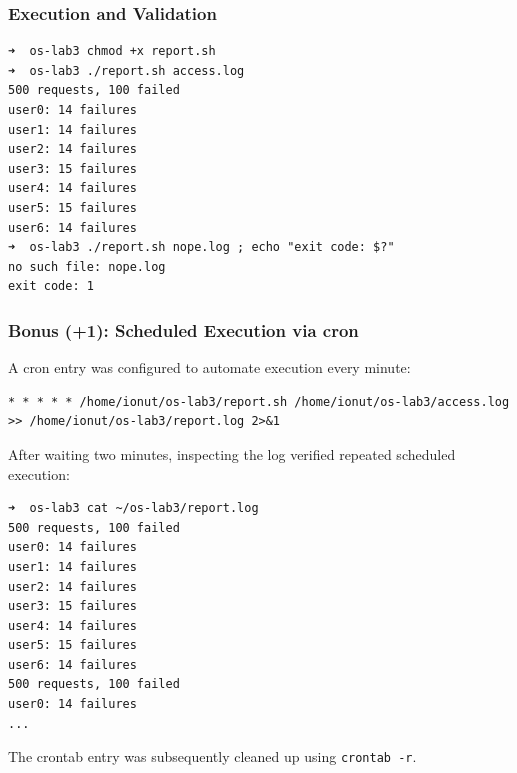 \documentclass{labreport}
\begin{document}
\subsubsection{Execution and Validation}
\begin{lstlisting}[style=bash]
➜  os-lab3 chmod +x report.sh
➜  os-lab3 ./report.sh access.log
500 requests, 100 failed
user0: 14 failures
user1: 14 failures
user2: 14 failures
user3: 15 failures
user4: 14 failures
user5: 15 failures
user6: 14 failures
➜  os-lab3 ./report.sh nope.log ; echo "exit code: $?"
no such file: nope.log
exit code: 1
\end{lstlisting}

\subsubsection*{Bonus (+1): Scheduled Execution via cron}
A cron entry was configured to automate execution every minute:
\begin{lstlisting}[style=bash]
* * * * * /home/ionut/os-lab3/report.sh /home/ionut/os-lab3/access.log >> /home/ionut/os-lab3/report.log 2>&1
\end{lstlisting}
After waiting two minutes, inspecting the log verified repeated scheduled execution:
\begin{lstlisting}[style=bash]
➜  os-lab3 cat ~/os-lab3/report.log
500 requests, 100 failed
user0: 14 failures
user1: 14 failures
user2: 14 failures
user3: 15 failures
user4: 14 failures
user5: 15 failures
user6: 14 failures
500 requests, 100 failed
user0: 14 failures
...
\end{lstlisting}
The crontab entry was subsequently cleaned up using \texttt{crontab -r}.
\end{document}
